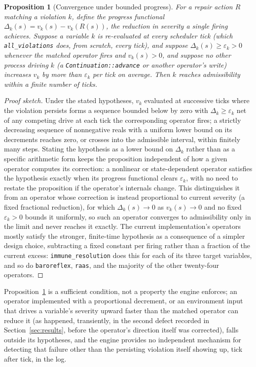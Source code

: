 \documentclass[11pt]{article}
\newtheorem{proposition}{Proposition}
\begin{document}
\begin{proposition}[Convergence under bounded progress]
\label{prop:convergence}
For a repair action $R$ matching a violation $k$, define the progress functional $\Delta_k(s) = v_k(s) - v_k(R(s))$, the reduction in severity a single firing achieves. Suppose a variable $k$ is re-evaluated at every scheduler tick (which \texttt{all\_violations} does, from scratch, every tick), and suppose $\Delta_k(s) \geq \varepsilon_k > 0$ whenever the matched operator fires and $v_k(s) > 0$, and suppose no other process driving $k$ (a \texttt{Continuation::advance} or another operator's write) increases $v_k$ by more than $\varepsilon_k$ per tick on average. Then $k$ reaches admissibility within a finite number of ticks.
\end{proposition}
\begin{proof}[Proof sketch]
Under the stated hypotheses, $v_k$ evaluated at successive ticks where the violation persists forms a sequence bounded below by zero with $\Delta_k \geq \varepsilon_k$ net of any competing drive at each tick the corresponding operator fires; a strictly decreasing sequence of nonnegative reals with a uniform lower bound on its decrements reaches zero, or crosses into the admissible interval, within finitely many steps. Stating the hypothesis as a lower bound on $\Delta_k$ rather than as a specific arithmetic form keeps the proposition independent of how a given operator computes its correction: a nonlinear or state-dependent operator satisfies the hypothesis exactly when its progress functional clears $\varepsilon_k$, with no need to restate the proposition if the operator's internals change. This distinguishes it from an operator whose correction is instead proportional to current severity (a fixed fractional reduction), for which $\Delta_k(s) \to 0$ as $v_k(s) \to 0$ and no fixed $\varepsilon_k > 0$ bounds it uniformly, so such an operator converges to admissibility only in the limit and never reaches it exactly. The current implementation's operators mostly satisfy the stronger, finite-time hypothesis as a consequence of a simpler design choice, subtracting a fixed constant per firing rather than a fraction of the current excess: \texttt{immune\_resolution} does this for each of its three target variables, and so do \texttt{baroreflex}, \texttt{raas}, and the majority of the other twenty-four operators.
\end{proof}
Proposition~\ref{prop:convergence} is a sufficient condition, not a property the engine enforces; an operator implemented with a proportional decrement, or an environment input that drives a variable's severity upward faster than the matched operator can reduce it (as happened, transiently, in the second defect recorded in Section~\ref{sec:results}, before the operator's direction itself was corrected), falls outside its hypotheses, and the engine provides no independent mechanism for detecting that failure other than the persisting violation itself showing up, tick after tick, in the log.
\end{document}
